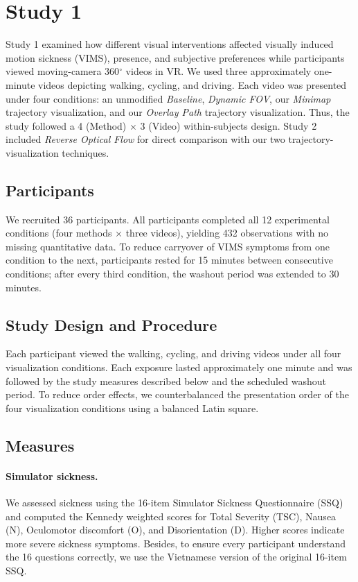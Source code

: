 \section{Study 1}
\label{sec:study1}

Study 1 examined how different visual interventions affected visually induced motion sickness (VIMS), presence, and subjective preferences while participants viewed moving-camera 360$^\circ$ videos in VR. We used three approximately one-minute videos depicting walking, cycling, and driving. Each video was presented under four conditions: an unmodified \textit{Baseline}, \textit{Dynamic FOV}, our \textit{Minimap} trajectory visualization, and our \textit{Overlay Path} trajectory visualization. Thus, the study followed a 4 (Method) $\times$ 3 (Video) within-subjects design. Study 2 included \textit{Reverse Optical Flow} for direct comparison with our two trajectory-visualization techniques.

\subsection{Participants}

We recruited 36 participants. All participants completed all 12 experimental conditions (four methods $\times$ three videos), yielding 432 observations with no missing quantitative data. To reduce carryover of VIMS symptoms from one condition to the next, participants rested for 15 minutes between consecutive conditions; after every third condition, the washout period was extended to 30 minutes. 

\subsection{Study Design and Procedure}

Each participant viewed the walking, cycling, and driving videos under all four visualization conditions. Each exposure lasted approximately one minute and was followed by the study measures described below and the scheduled washout period. To reduce order effects, we counterbalanced the presentation order of the four visualization conditions using a balanced Latin square.


\subsection{Measures}
\label{subsec:study1-measures}

\paragraph{Simulator sickness.}
We assessed sickness using the 16-item Simulator Sickness Questionnaire (SSQ) and computed the Kennedy weighted scores for Total Severity (TSC), Nausea (N), Oculomotor discomfort (O), and Disorientation (D). Higher scores indicate more severe sickness symptoms. Besides, to ensure every participant understand the 16 questions correctly, we use the Vietnamese version of the original 16-item SSQ. 

